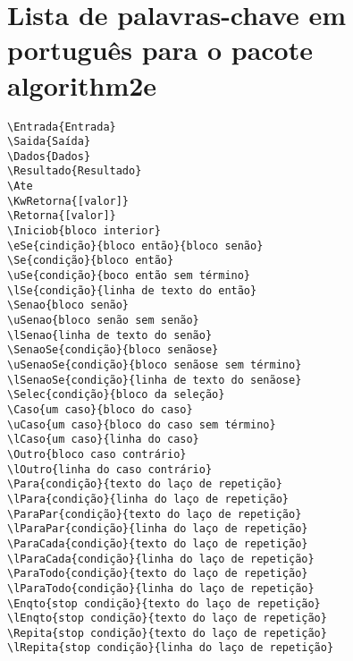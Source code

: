 \chapter{Lista de palavras-chave em português para o pacote \textsf{algorithm2e}}
\label{apend:algorithm2e}

\begin{verbatim}
\Entrada{Entrada} 
\Saida{Saída} 
\Dados{Dados} 
\Resultado{Resultado}
\Ate 
\KwRetorna{[valor]} 
\Retorna{[valor]}
\Iniciob{bloco interior}
\eSe{cindição}{bloco então}{bloco senão} 
\Se{condição}{bloco então} 
\uSe{condição}{boco então sem término} 
\lSe{condição}{linha de texto do então} 
\Senao{bloco senão}
\uSenao{bloco senão sem senão}
\lSenao{linha de texto do senão} 
\SenaoSe{condição}{bloco senãose} 
\uSenaoSe{condição}{bloco senãose sem término} 
\lSenaoSe{condição}{linha de texto do senãose}
\Selec{condição}{bloco da seleção} 
\Caso{um caso}{bloco do caso}
\uCaso{um caso}{bloco do caso sem término} 
\lCaso{um caso}{linha do caso} 
\Outro{bloco caso contrário} 
\lOutro{linha do caso contrário}
\Para{condição}{texto do laço de repetição} 
\lPara{condição}{linha do laço de repetição}
\ParaPar{condição}{texto do laço de repetição} 
\lParaPar{condição}{linha do laço de repetição}
\ParaCada{condição}{texto do laço de repetição} 
\lParaCada{condição}{linha do laço de repetição}
\ParaTodo{condição}{texto do laço de repetição} 
\lParaTodo{condição}{linha do laço de repetição}
\Enqto{stop condição}{texto do laço de repetição} 
\lEnqto{stop condição}{texto do laço de repetição}
\Repita{stop condição}{texto do laço de repetição} 
\lRepita{stop condição}{linha do laço de repetição}
\end{verbatim}

